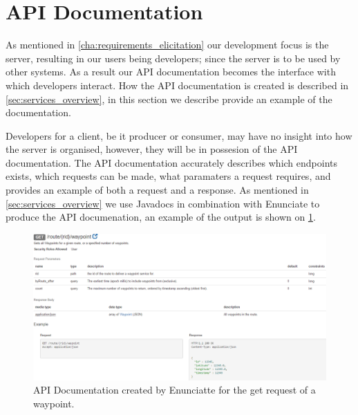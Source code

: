 \section{API Documentation}\label{sec:api_documentation}
As mentioned in \cref{cha:requirements_elicitation} our development focus is the server, resulting in our users being developers; since the server is to be used by other systems.
As a result our API documentation becomes the interface with which developers interact.
How the API documentation is created is described in \cref{sec:services_overview}, in this section we describe provide an example of the documentation.

\bigskip
Developers for a client, be it producer or consumer, may have no insight into how the server is organised, however, they will be in possesion of the API documentation.
The API documentation accurately describes which endpoints exists, which requests can be made, what paramaters a request requires, and provides an example of both a request and a response.
As mentioned in \cref{sec:services_overview} we use Javadocs in combination with Enunciate to produce the API documenation, an example of the output is shown on \cref{fig:enunciate_example}.

\begin{figure}[!htb]
    \centering
    \includegraphics[width=1\textwidth]{img/enunciateexample.png}
    \caption{API Documentation created by Enunciatte for the get request of a waypoint.}
    \label{fig:enunciate_example}
\end{figure}

